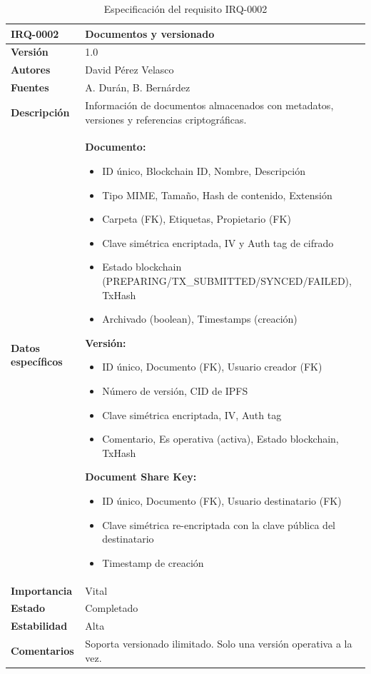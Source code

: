 \documentclass[11pt, a4paper]{article}
\begin{document}
\begin{table}[H]
    \centering
    \small
    \begin{tabular}{|p{4cm}|p{10cm}|}
    \hline
    \textbf{IRQ-0002} & Documentos y versionado \\
    \hline
    \textbf{Versión} & 1.0 \\
    \hline
    \textbf{Autores} & David Pérez Velasco \\
    \hline
    \textbf{Fuentes} & A. Durán, B. Bernárdez \\
    \hline
    \textbf{Descripción} & Información de documentos almacenados con metadatos, versiones y referencias criptográficas. \\
    \hline
    \textbf{Datos específicos} & 
    \textbf{Documento:}
    \begin{itemize}
        \item ID único, Blockchain ID, Nombre, Descripción
        \item Tipo MIME, Tamaño, Hash de contenido, Extensión
        \item Carpeta (FK), Etiquetas, Propietario (FK)
        \item Clave simétrica encriptada, IV y Auth tag de cifrado
        \item Estado blockchain (PREPARING/TX\_SUBMITTED/SYNCED/FAILED), TxHash
        \item Archivado (boolean), Timestamps (creación)
    \end{itemize}
    
    \textbf{Versión:}
    \begin{itemize}
        \item ID único, Documento (FK), Usuario creador (FK)
        \item Número de versión, CID de IPFS
        \item Clave simétrica encriptada, IV, Auth tag
        \item Comentario, Es operativa (activa), Estado blockchain, TxHash
    \end{itemize}
    
    \textbf{Document Share Key:}
    \begin{itemize}
        \item ID único, Documento (FK), Usuario destinatario (FK)
        \item Clave simétrica re-encriptada con la clave pública del destinatario
        \item Timestamp de creación
    \end{itemize} \\
    \hline
    \textbf{Importancia} & Vital \\
    \hline
    \textbf{Estado} & Completado \\
    \hline
    \textbf{Estabilidad} & Alta \\
    \hline
    \textbf{Comentarios} & Soporta versionado ilimitado. Solo una versión operativa a la vez. \\
    \hline
    \end{tabular}
    \caption{Especificación del requisito IRQ-0002}
\end{table}
\end{document}
